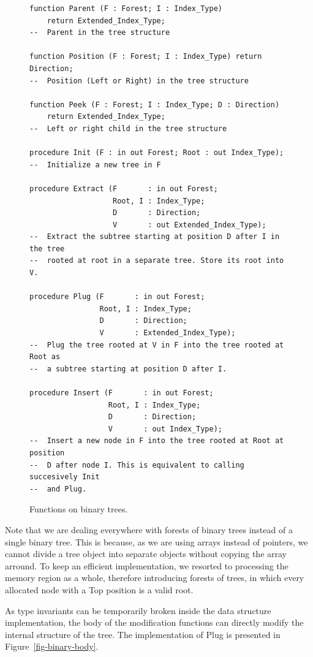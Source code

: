 \documentclass[11pt,a4paper]{article}
\begin{document}
\begin{figure}[ht]
\begin{small}
\begin{lstlisting}
function Parent (F : Forest; I : Index_Type)
    return Extended_Index_Type;
--  Parent in the tree structure

function Position (F : Forest; I : Index_Type) return Direction;
--  Position (Left or Right) in the tree structure

function Peek (F : Forest; I : Index_Type; D : Direction)
    return Extended_Index_Type;
--  Left or right child in the tree structure

procedure Init (F : in out Forest; Root : out Index_Type);
--  Initialize a new tree in F

procedure Extract (F       : in out Forest;
                   Root, I : Index_Type;
                   D       : Direction;
                   V       : out Extended_Index_Type);
--  Extract the subtree starting at position D after I in the tree
--  rooted at root in a separate tree. Store its root into V.

procedure Plug (F       : in out Forest;
                Root, I : Index_Type;
                D       : Direction;
                V       : Extended_Index_Type);
--  Plug the tree rooted at V in F into the tree rooted at Root as
--  a subtree starting at position D after I.

procedure Insert (F       : in out Forest;
                  Root, I : Index_Type;
                  D       : Direction;
                  V       : out Index_Type);
--  Insert a new node in F into the tree rooted at Root at position
--  D after node I. This is equivalent to calling succesively Init
--  and Plug.
\end{lstlisting}
\end{small}
\caption{\label{fig-binary-fun} Functions on binary trees.}
\end{figure}

Note that we are dealing everywhere with forests of binary trees instead of a single
binary tree. This is because, as we are using arrays instead of pointers, we cannot divide a
tree object into separate objects without copying the array arround. To keep an efficient
implementation, we resorted to processing the memory region as a whole, therefore
introducing forests of trees, in which every allocated node with a Top position is a
valid root.

As type invariants can be temporarily broken inside the data structure implementation, the body
of the modification functions can directly modify the internal structure of the tree. The implementation
of Plug is presented in Figure~\ref{fig-binary-body}.
\end{document}
